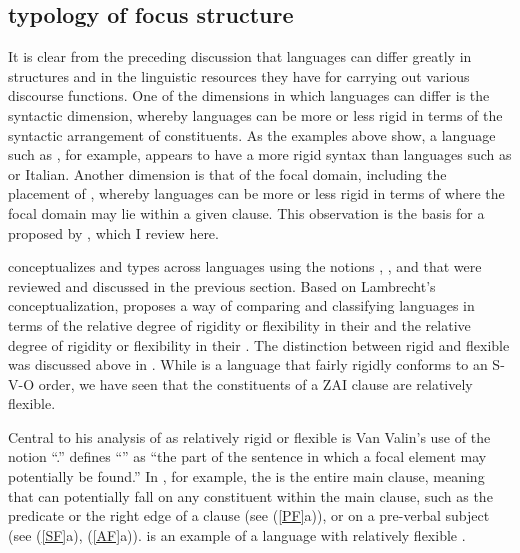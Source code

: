 \subsection{ typology of focus structure}

It is clear from the preceding discussion that languages can differ greatly in  structures and in the linguistic resources they have for carrying out various discourse functions. One of the dimensions in which languages can differ is the syntactic dimension, whereby languages can be more or less rigid in terms of the syntactic arrangement of constituents. As the examples above show, a language such as , for example, appears to have a more rigid syntax than languages such as  or Italian. Another dimension is that of the focal domain, including the placement of , whereby languages can be more or less rigid in terms of where the focal domain may lie within a given clause. This observation is the basis for a  proposed by \citet{vanvalin1999}, which I review here. 

 
\citet{lambrecht1994} conceptualizes  and  types across languages using the notions , , and  that were reviewed and discussed in the previous section. Based on Lambrecht's conceptualization, \citet{vanvalin1999} proposes a way of comparing and classifying languages in terms of the relative degree of rigidity or flexibility in their  and the relative degree of rigidity or flexibility in their . The distinction between rigid and flexible  was discussed above in . While  is a language that fairly rigidly conforms to an S-V-O order, we have seen that the constituents of a ZAI clause are relatively flexible.

Central to his analysis of  as relatively rigid or flexible is Van Valin's use of the notion ``.'' \citet[513]{vanvalin1999} defines ``'' as ``the part of the sentence in which a focal element may potentially be found.'' In , for example, the  is the entire main clause, meaning that  can potentially fall on any constituent within the main clause, such as the predicate or the right edge of a clause (see (\ref{PF}a)), or on a pre-verbal subject (see (\ref{SF}a), (\ref{AF}a)).  is an example of a language with relatively flexible . 

